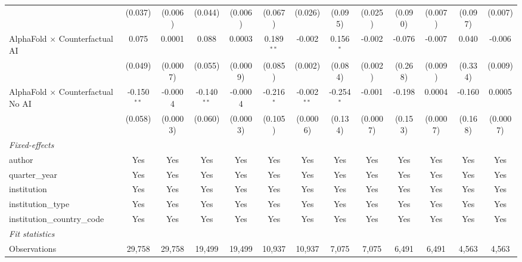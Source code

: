 \begin{tabular}{lcccccccccccc}
                                            & (0.037)       & (0.006)  & (0.044)       & (0.006)  & (0.067)       & (0.026)       & (0.095)      & (0.025)     & (0.090) & (0.007)  & (0.097) & (0.007)\\   
   AlphaFold $\times$ Counterfactual AI     & 0.075         & 0.0001   & 0.088         & 0.0003   & 0.189$^{**}$  & -0.002        & 0.156$^{*}$  & -0.002      & -0.076  & -0.007   & 0.040   & -0.006\\   
                                            & (0.049)       & (0.0007) & (0.055)       & (0.0009) & (0.085)       & (0.002)       & (0.084)      & (0.002)     & (0.268) & (0.009)  & (0.334) & (0.009)\\   
   AlphaFold $\times$ Counterfactual No AI  & -0.150$^{**}$ & -0.0004  & -0.140$^{**}$ & -0.0004  & -0.216$^{*}$  & -0.002$^{**}$ & -0.254$^{*}$ & -0.001      & -0.198  & 0.0004   & -0.160  & 0.0005\\   
                                            & (0.058)       & (0.0003) & (0.060)       & (0.0003) & (0.105)       & (0.0006)      & (0.134)      & (0.0007)    & (0.153) & (0.0007) & (0.168) & (0.0007)\\   
   \midrule
   \emph{Fixed-effects}\\
   author                                   & Yes           & Yes      & Yes           & Yes      & Yes           & Yes           & Yes          & Yes         & Yes     & Yes      & Yes     & Yes\\  
   quarter\_year                            & Yes           & Yes      & Yes           & Yes      & Yes           & Yes           & Yes          & Yes         & Yes     & Yes      & Yes     & Yes\\  
   institution                              & Yes           & Yes      & Yes           & Yes      & Yes           & Yes           & Yes          & Yes         & Yes     & Yes      & Yes     & Yes\\  
   institution\_type                        & Yes           & Yes      & Yes           & Yes      & Yes           & Yes           & Yes          & Yes         & Yes     & Yes      & Yes     & Yes\\  
   institution\_country\_code               & Yes           & Yes      & Yes           & Yes      & Yes           & Yes           & Yes          & Yes         & Yes     & Yes      & Yes     & Yes\\  
   \midrule
   \emph{Fit statistics}\\
   Observations                             & 29,758        & 29,758   & 19,499        & 19,499   & 10,937        & 10,937        & 7,075        & 7,075       & 6,491   & 6,491    & 4,563   & 4,563\\  

\end{tabular}
